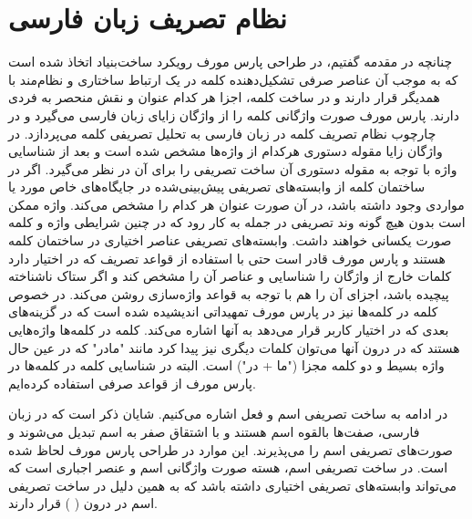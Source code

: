 \documentclass[12pt,onecolumn,a4paper]{article}
\begin{document}
    \section{نظام تصریف زبان فارسی}
    چنانچه در مقدمه گفتیم، در طراحی پارس مورف رویکرد ساخت‌بنیاد اتخاذ شده است که به موجب آن عناصر صرفی تشکیل‌دهنده کلمه در یک ارتباط ساختاری و نظام‌مند با همدیگر قرار دارند و در ساخت کلمه، اجزا هر کدام عنوان و نقش منحصر به فردی دارند. پارس مورف صورت واژگانی کلمه را از واژگان زایای زبان فارسی {\mfo\citep{eslami_83}} می‌گیرد و در چارچوب نظام تصریف کلمه در زبان فارسی {\mfo\citep{eslami_88}} به تحلیل تصریفی کلمه می‌پردازد. در واژگان زایا مقوله دستوری هرکدام از واژه‌ها مشخص شده است و بعد از شناسایی واژه با توجه به مقوله دستوری آن ساخت تصریفی را برای آن در نظر می‌گیرد. اگر در ساختمان کلمه از وابسته‌های تصریفی پیش‌بینی‌شده در جایگاه‌های خاص مورد یا مواردی وجود داشته باشد، در آن صورت عنوان هر کدام را مشخص می‌کند. واژه ممکن است بدون هیچ گونه وند تصریفی در جمله به کار رود که در چنین شرایطی واژه و کلمه صورت یکسانی خواهند داشت. وابسته‌های تصریفی عناصر اختیاری در ساختمان کلمه هستند و پارس مورف قادر است حتی با استفاده از قواعد تصریف که در اختیار دارد کلمات خارج از واژگان را شناسایی و عناصر آن را مشخص کند و اگر ستاک ناشناخته پیچیده باشد، اجزای آن را هم با توجه به قواعد واژه‌سازی روشن می‌کند. در خصوص کلمه در کلمه‌ها  نیز در پارس مورف تمهیداتی اندیشیده شده است که در گزینه‌های بعدی که در اختیار کاربر قرار می‌دهد به آنها اشاره می‌کند. کلمه در کلمه‌ها واژه‌هایی هستند که در درون آنها می‌توان کلمات دیگری نیز پیدا کرد مانند "مادر" که در عین حال واژه بسیط و دو کلمه مجزا ("ما + در") است. البته در شناسایی کلمه در کلمه‌ها در پارس مورف از قواعد صرفی استفاده کرده‌ایم.
    \par
    در ادامه به ساخت تصریفی اسم و فعل اشاره می‌کنیم. شایان ذکر است که در زبان فارسی، صفت‌ها بالقوه اسم هستند و با اشتقاق صفر به اسم تبدیل می‌شوند و صورت‌های تصریفی اسم را می‌پذیرند. این موارد در طراحی پارس مورف لحاظ شده است. در ساخت تصریفی اسم، هسته صورت واژگانی اسم و عنصر اجباری است که می‌تواند وابسته‌های تصریفی اختیاری داشته باشد که به همین دلیل در ساخت تصریفی اسم در درون ( ) قرار دارند.
\end{document}
